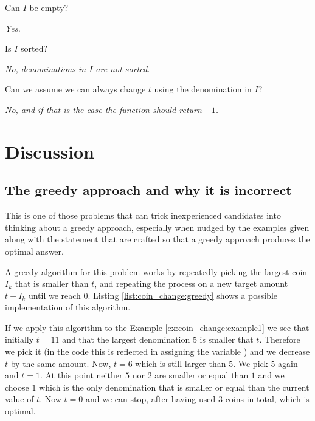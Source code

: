 \begin{QandA}

	\item Can $I$ be empty?
	\begin{answered}
		\textit{Yes.}
	\end{answered}

	\item Is $I$ sorted?
	\begin{answered}
		\textit{No, denominations in $I$ are not sorted.}
	\end{answered}

	\item Can we assume we can always change $t$ using the denomination in $I$?
	\begin{answered}
		\textit{No, and if that is the case the function should return $-1$.}
	\end{answered}
	
\end{QandA}

\section{Discussion}
\label{coin_change:sec:discussion}

\subsection{The greedy approach and why it is incorrect}
This is one of those problems that can trick inexperienced candidates into thinking about a greedy approach, especially when nudged by the examples given along with the statement that are crafted so that a greedy approach produces the optimal answer.

A greedy algorithm for this problem works by repeatedly picking the largest coin $I_k$ that is smaller than $t$, and repeating the process on a new target amount $t-I_k$ until we reach $0$.
Listing \ref{list:coin_change:greedy} shows a possible implementation of this algorithm.

If we apply this algorithm to the Example \ref{ex:coin_change:example1}  we see that initially $t=11$
and that the largest denomination $5$ is smaller that $t$. Therefore we pick it (in the code this is reflected in assigning the variable ) and we decrease $t$ by the same amount.
Now, $t=6$ which is still larger than $5$. We pick $5$ again and $t = 1$.
At this point neither $5$ nor $2$ are smaller or equal than $1$ and we choose $1$ which is the only denomination that is smaller or equal than the current value of $t$.
Now $t=0$ and we can stop, after having used $3$ coins in total, which is optimal.

